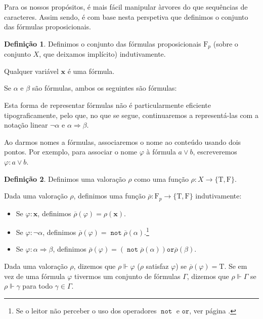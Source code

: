 \documentclass{report}
\theoremstyle{definition}
\newtheorem{definicao}{Definição}
\theoremstyle{remark}
\renewcommand{\bf}[1]{\mathbf{#1}}
\newcommand{\F}{\mathrm{F}}
\newcommand{\lt}{\mathrm{T}}
\newcommand{\lf}{\mathrm{F}}
\DeclareMathOperator{\pnot}{\texttt{not}}
\newcommand{\por}{\mathbin{\texttt{or}}}
\newcommand{\imply}{\mathbin{\Rightarrow}}
\begin{document}
	Para os nossos propósitos, é mais fácil manipular àrvores do que sequências de caracteres. Assim sendo, é com base nesta perspetiva que definimos o conjunto das fórmulas proposicionais.
	
	\begin{definicao}
	Definimos o conjunto das fórmulas proposicionais $\F_p$ (sobre o conjunto $X$, que deixamos implícito) indutivamente.
	
	Qualquer variável $\bf x$ é uma fórmula.
	
	Se $\alpha$ e $\beta$ são fórmulas, ambos os seguintes são fórmulas:
	
	\begin{center}
	\hspace{3em}
	\end{center}
	
	Esta forma de representar fórmulas não é particularmente eficiente tipograficamente, pelo que, no que se segue, continuaremos a representá-las com a notação linear $\neg \alpha$ e $\alpha \imply \beta$.
	
	Ao darmos nomes a fórmulas, associaremos o nome ao conteúdo usando dois pontos. Por exemplo, para associar o nome $\varphi$ à fórmula $a \lor b$, escreveremos $\varphi : a \lor b$.
	\end{definicao}
	
	\begin{definicao}
	Definimos uma valoração $\rho$ como uma função $\rho : X \to \{\lt,\lf\}$.
	
	Dada uma valoração $\rho$, definimos uma função $\overline\rho : \F_p \to \{\lt, \lf\}$ indutivamente:
	
	\begin{itemize}
	\item Se $\varphi : \bf x$, definimos $\overline\rho(\varphi) = \rho(\bf x)$.
	
	\item Se $\varphi : \neg \alpha$, definimos $\overline\rho(\varphi) = \pnot \overline\rho(\alpha)$.\footnote{Se o leitor não perceber o uso dos operadores $\pnot$ e $\por$, ver página \pageref{tabela:operadores}.}
	
	\item Se $\varphi : \alpha \imply \beta$, definimos $\overline\rho(\varphi) = (\pnot \overline\rho(\alpha)) \por \overline\rho(\beta)$.
	\end{itemize}
	
	Dada uma valoração $\rho$, dizemos que $\rho \Vdash \varphi$ ($\rho$ satisfaz $\varphi$) se $\overline\rho(\varphi) = \lt$. Se em vez de uma fórmula $\varphi$ tivermos um conjunto de fórmulas $\Gamma$, dizemos que $\rho \Vdash \Gamma$ se $\rho \Vdash \gamma$ para todo $\gamma \in \Gamma$.
	\end{definicao}
	
\end{document}
